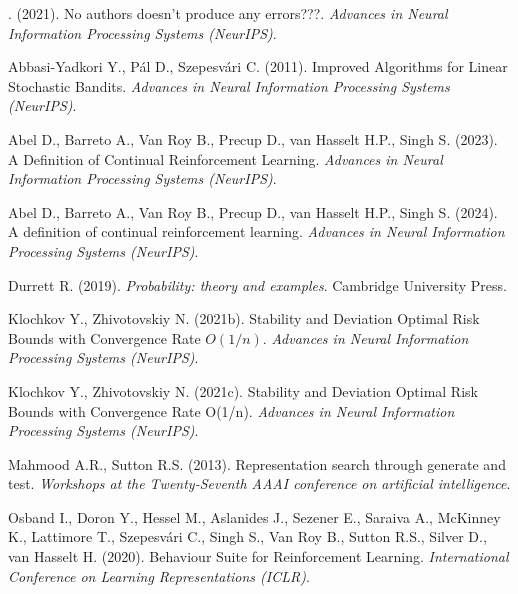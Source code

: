 %
{ . (2021). No authors doesn't produce any errors???. \textit{Advances in Neural Information Processing Systems (NeurIPS)}.}

%
{Abbasi{-}Yadkori Y., P{\'{a}}l D., Szepesv{\'{a}}ri C. (2011). Improved Algorithms for Linear Stochastic Bandits. \textit{Advances in Neural Information Processing Systems (NeurIPS)}.}

%
{Abel D., Barreto A., Van Roy B., Precup D., van Hasselt H.P., Singh S. (2023). A Definition of Continual Reinforcement Learning. \textit{Advances in Neural Information Processing Systems (NeurIPS)}.}

%
{Abel D., Barreto A., Van Roy B., Precup D., van Hasselt H.P., Singh S. (2024). A definition of continual reinforcement learning. \textit{Advances in Neural Information Processing Systems (NeurIPS)}.}

%
{Durrett R. (2019). \textit{Probability: theory and examples}. Cambridge University Press.}

%
{Klochkov Y., Zhivotovskiy N. (2021b). Stability and Deviation Optimal Risk Bounds with Convergence Rate $ O (1/n) $. \textit{Advances in Neural Information Processing Systems (NeurIPS)}.}

%
{Klochkov Y., Zhivotovskiy N. (2021c). Stability and Deviation Optimal Risk Bounds with Convergence Rate {\textdollar}O(1/n){\textdollar}. \textit{Advances in Neural Information Processing Systems (NeurIPS)}.}

%
{Mahmood A.R., Sutton R.S. (2013). Representation search through generate and test. \textit{Workshops at the Twenty-Seventh AAAI conference on artificial intelligence}.}

%
{Osband I., Doron Y., Hessel M., Aslanides J., Sezener E., Saraiva A., McKinney K., Lattimore T., Szepesv{\'{a}}ri C., Singh S., Van Roy B., Sutton R.S., Silver D., van Hasselt H. (2020). Behaviour Suite for Reinforcement Learning. \textit{International Conference on Learning Representations (ICLR)}.}

